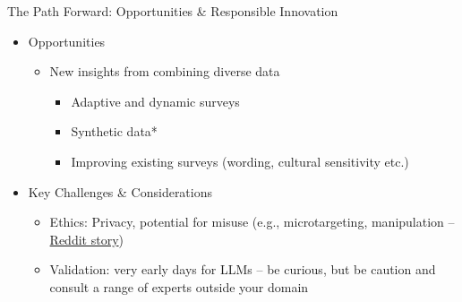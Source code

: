 \documentclass[10pt,aspectratio=169]{beamer}
\begin{document}
\begin{frame}{The Path Forward: Opportunities \& Responsible Innovation}

\begin{itemize}
    \item Opportunities
    \begin{itemize}
        \item New insights from combining diverse data
        \begin{itemize}
            \item Adaptive and dynamic surveys 
            \item Synthetic data*
            \item Improving existing surveys (wording, cultural sensitivity etc.)
        \end{itemize}
    \end{itemize}
    \item Key Challenges \& Considerations
    \begin{itemize}
        \item Ethics: Privacy, potential for misuse (e.g., microtargeting, manipulation -- \href{https://www.reddit.com/r/changemyview/comments/1k8b2hj/comment/mp4vgcm/?share_id=W7n2eWmaRZq3odRwfc_-5}{Reddit story})
        \item Validation: very early days for LLMs -- be curious, but be caution and consult a range of experts outside your domain
    \end{itemize}
\end{itemize}


\end{frame}
\end{document}
